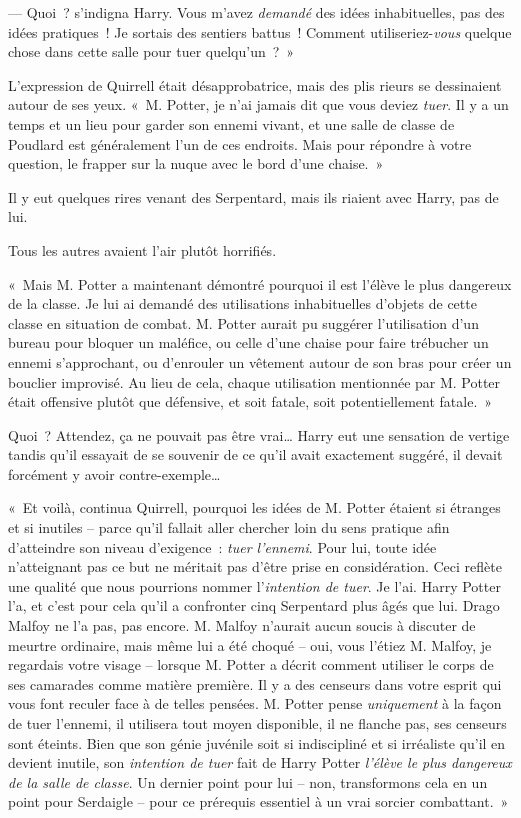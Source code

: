 --- Quoi~? s'indigna Harry.
Vous m'avez \emph{demandé} des idées inhabituelles, pas des idées pratiques~!
Je sortais des sentiers battus~!
Comment utiliseriez-\emph{vous} quelque chose dans cette salle pour tuer quelqu'un~?~»

L'expression de Quirrell était désapprobatrice, mais des plis rieurs se dessinaient autour de ses yeux.
«~M. Potter, je n'ai jamais dit que vous deviez \emph{tuer}.
Il y a un temps et un lieu pour garder son ennemi vivant, et une salle de classe de Poudlard est généralement l'un de ces endroits.
Mais pour répondre à votre question, le frapper sur la nuque avec le bord d'une chaise.~»

Il y eut quelques rires venant des Serpentard, mais ils riaient avec Harry, pas de lui.

Tous les autres avaient l'air plutôt horrifiés.

«~Mais M. Potter a maintenant démontré pourquoi il est l'élève le plus dangereux de la classe.
Je lui ai demandé des utilisations inhabituelles d'objets de cette classe en situation de combat.
M. Potter aurait pu suggérer l'utilisation d'un bureau pour bloquer un maléfice, ou celle d'une chaise pour faire trébucher un ennemi s'approchant, ou d'enrouler un vêtement autour de son bras pour créer un bouclier improvisé.
Au lieu de cela, chaque utilisation mentionnée par M. Potter était offensive plutôt que défensive, et soit fatale, soit potentiellement fatale.~»

Quoi~? Attendez, ça ne pouvait pas être vrai…
Harry eut une sensation de vertige tandis qu'il essayait de se souvenir de ce qu'il avait exactement suggéré, il devait forcément y avoir contre-exemple…

«~Et voilà, continua Quirrell, pourquoi les idées de M. Potter étaient si étranges et si inutiles -- parce qu'il fallait aller chercher loin du sens pratique afin d'atteindre son niveau d'exigence~: \emph{tuer l'ennemi}.
Pour lui, toute idée n'atteignant pas ce but ne méritait pas d'être prise en considération.
Ceci reflète une qualité que nous pourrions nommer l'\emph{intention de tuer}.
Je l'ai.
Harry Potter l'a, et c'est pour cela qu'il a confronter cinq Serpentard plus âgés que lui.
Drago Malfoy ne l'a pas, pas encore.
M. Malfoy n'aurait aucun soucis à discuter de meurtre ordinaire, mais même lui a été choqué -- oui, vous l'étiez M. Malfoy, je regardais votre visage -- lorsque M. Potter a décrit comment utiliser le corps de ses camarades comme matière première.
Il y a des censeurs dans votre esprit qui vous font reculer face à de telles pensées.
M. Potter pense \emph{uniquement} à la façon de tuer l'ennemi, il utilisera tout moyen disponible, il ne flanche pas, ses censeurs sont éteints.
Bien que son génie juvénile soit si indiscipliné et si irréaliste qu'il en devient inutile, son \emph{intention de tuer} fait de Harry Potter \emph{l'élève le plus dangereux de la salle de classe}.
Un dernier point pour lui -- non, transformons cela en un point pour Serdaigle -- pour ce prérequis essentiel à un vrai sorcier combattant.~»

